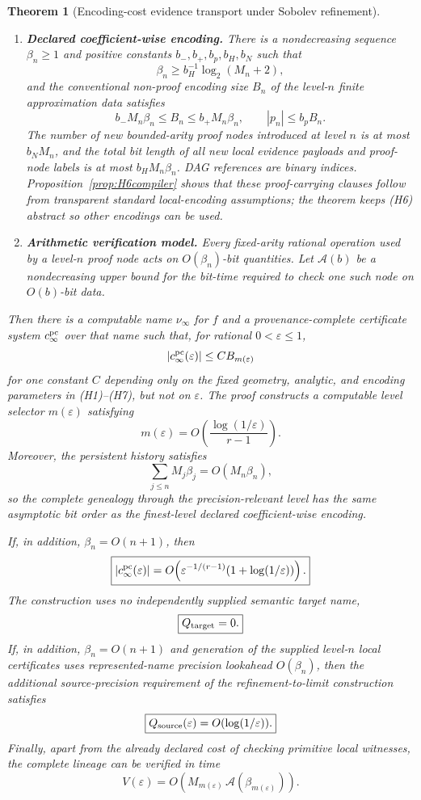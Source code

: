 \documentclass[11pt]{article}
\newtheorem{theorem}{Theorem}[section]
\theoremstyle{definition}
\begin{document}
\begin{theorem}[Encoding-cost evidence transport under Sobolev refinement]
\begin{enumerate}[label=(H\arabic*)]
\item \textbf{Declared coefficient-wise encoding.} There is a nondecreasing sequence
$\beta_n\ge1$ and positive constants $b_-,b_+,b_p,b_H,b_N$ such that
\[
 \beta_n\ge b_H^{-1}\log_2(M_n+2),
\]
and the conventional non-proof encoding size $B_n$ of the level-$n$ finite approximation
data satisfies
\[
 b_-M_n\beta_n\le B_n\le b_+M_n\beta_n,
 \qquad
 |p_n|\le b_pB_n.
\]
The number of new bounded-arity proof nodes introduced at level $n$ is at most $b_NM_n$,
and the total bit length of all \emph{new} local evidence payloads and proof-node labels is
at most $b_HM_n\beta_n$.  DAG references are binary indices.  Proposition~\ref{prop:H6compiler}
shows that these proof-carrying clauses follow from transparent standard local-encoding
assumptions; the theorem keeps (H6) abstract so other encodings can be used.

\item \textbf{Arithmetic verification model.} Every fixed-arity rational operation used
by a level-$n$ proof node acts on $O(\beta_n)$-bit quantities.  Let $\mathcal A(b)$ be a
nondecreasing upper bound for the bit-time required to check one such node on $O(b)$-bit
data.
\end{enumerate}
Then there is a computable name $\nu_\infty$ for $f$ and a provenance-complete certificate
system $c_\infty^{\rm pc}$ over that name such that, for rational
$0<\varepsilon\le1$,
\[
 |c_\infty^{\rm pc}(\varepsilon)|
 \le C B_{m(\varepsilon)}
\]
for one constant $C$ depending only on the fixed geometry, analytic, and encoding
parameters in (H1)--(H7), but not on $\varepsilon$.  The proof constructs a computable
level selector $m(\varepsilon)$ satisfying
\[
 m(\varepsilon)
 =O\!\left(\frac{\log(1/\varepsilon)}{r-1}\right).
\]
Moreover, the persistent history satisfies
\[
 \sum_{j\le n}M_j\beta_j=O(M_n\beta_n),
\]
so the complete genealogy through the precision-relevant level has the same asymptotic bit
order as the finest-level declared coefficient-wise encoding.

If, in addition, $\beta_n=O(n+1)$, then
\[
 \boxed{
 |c_\infty^{\rm pc}(\varepsilon)|
 =O\!\left(
 \varepsilon^{-1/(r-1)}
 (1+\log(1/\varepsilon))
 \right).}
\]
The construction uses no independently supplied semantic target name,
\[
 \boxed{Q_{\rm target}=0.}
\]
If, in addition, $\beta_n=O(n+1)$ and generation of the supplied level-$n$ local
certificates uses represented-name precision lookahead $O(\beta_n)$, then the additional
source-precision requirement of the refinement-to-limit construction satisfies
\[
 \boxed{Q_{\rm source}(\varepsilon)=O(\log(1/\varepsilon)).}
\]
Finally, apart from the already declared cost of checking primitive local witnesses, the
complete lineage can be verified in time
\[
 \boxed{
 V(\varepsilon)
 =O\!\left(
 M_{m(\varepsilon)}\,
 \mathcal A(\beta_{m(\varepsilon)})
 \right).}
\]
\end{theorem}
\end{document}
